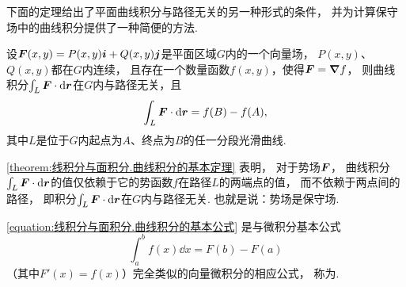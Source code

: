 下面的定理给出了平面曲线积分与路径无关的另一种形式的条件，
并为计算保守场中的曲线积分提供了一种简便的方法.
\begin{theorem}[曲线积分的基本定理]\label{theorem:线积分与面积分.曲线积分的基本定理}
设\(\boldsymbol{F}(x,y)=P(x,y)\boldsymbol{i}+Q(x,y)\boldsymbol{j}\)是平面区域\(G\)内的一个向量场，
\(P(x,y)\)、\(Q(x,y)\)都在\(G\)内连续，
且存在一个数量函数\(f(x,y)\)，使得\(\boldsymbol{F}=\grad f\)，
则曲线积分\(\int_L\boldsymbol{F}\cdot\dd{\boldsymbol{r}}\)在\(G\)内与路径无关，且
\begin{equation}\label{equation:线积分与面积分.曲线积分的基本公式}
	\int_L \boldsymbol{F}\cdot\dd{\boldsymbol{r}}
	= f(B)-f(A),
\end{equation}
其中\(L\)是位于\(G\)内起点为\(A\)、终点为\(B\)的任一分段光滑曲线.
\end{theorem}

\cref{theorem:线积分与面积分.曲线积分的基本定理} 表明，
对于势场\(\boldsymbol{F}\)，
曲线积分\(\int_L \boldsymbol{F}\cdot\dd{\boldsymbol{r}}\)的值仅依赖于它的势函数\(f\)在路径\(L\)的两端点的值，
而不依赖于两点间的路径，
即积分\(\int_L \boldsymbol{F}\cdot\dd{\boldsymbol{r}}\)在\(G\)内与路径无关.
也就是说：势场是保守场.

\cref{equation:线积分与面积分.曲线积分的基本公式}
是与微积分基本公式\[
	\int_a^b f(x) \dd{x}
	= F(b) - F(a)
\]
（其中\(F'(x) = f(x)\)）完全类似的向量微积分的相应公式，
称为.

